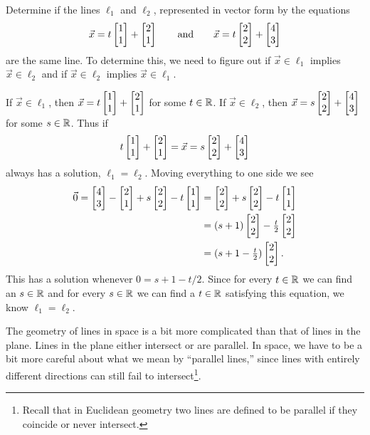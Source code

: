\begin{example}
	Determine if the lines $\ell_1$ and $\ell_2$, represented in vector form by the equations
	\[
		\vec x=t\mat{1\\1}+\mat{2\\1}\qquad\text{and}\qquad 
		\vec x=t\mat{2\\2}+\mat{4\\3}
	\]
	are the same line.  To determine this, we need to figure out if $\vec x\in\ell_1$
	implies $\vec x\in \ell_2$ and if $\vec x\in\ell_2$ implies $\vec x\in\ell_1$.  

	If $\vec x\in\ell_1$, then $\vec x=t\mat{1\\1}+\mat{2\\1}$ for some $t\in\mathbb{R}$.  If
	$\vec x\in\ell_2$, then $\vec x=s\mat{2\\2}+\mat{4\\3}$ for some $s\in \mathbb{R}$.  Thus if
	\[
		t\mat{1\\1}+\mat{2\\1} = \vec x = s\mat{2\\2}+\mat{4\\3}
	\]
	always has a solution, $\ell_1=\ell_2$.  Moving everything to one side we see
	\begin{align*}
		\vec 0 = \mat{4\\3}-\mat{2\\1} + s\mat{2\\2}-t\mat{1\\1}
		&=\mat{2\\2}+s\mat{2\\2}-t\mat{1\\1}\\
		&=(s+1)\mat{2\\2}-\tfrac{t}{2}\mat{2\\2}\\
		&= (s+1-\tfrac{t}{2})\mat{2\\2}.
	\end{align*}
	This has a solution whenever $0=s+1-t/2$.  Since for every $t\in\mathbb{R}$ we can find an $s\in\mathbb{R}$
	and for every $s\in \mathbb{R}$ we can find a $t\in \mathbb{R}$ satisfying this equation, we know $\ell_1=\ell_2$.
\end{example}


The geometry of lines in space is a bit more complicated than that of lines
in the plane.  Lines in the plane either intersect or are parallel.
In space,  we have to be a bit more careful about what we mean by
``parallel lines,'' since lines with entirely different directions can
still fail to intersect\footnote{ Recall that in Euclidean geometry
two lines are defined to be parallel if they coincide or never intersect.}.

